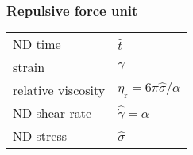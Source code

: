 \documentclass[fontsize=11pt]{scrartcl}
\begin{document}
\subsubsection*{Repulsive force unit}

\begin{center}
  \begin{tabular}{ll}
    ND time & $\hat{t}$  \\
    strain  &
    $\gamma $ \\
    relative viscosity &
    $ \eta_{\mathrm{r}}
    = 6 \pi \hat{\sigma} /\alpha$
    \\
    ND shear rate &
    $\hat{\dot{\gamma}} = \alpha$ \\
    ND stress & $\hat{\sigma} $
  \end{tabular} 
\end{center}
\end{document}
